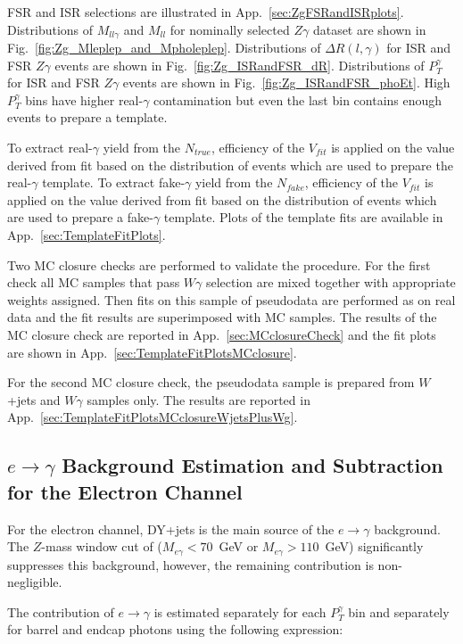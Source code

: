 FSR and ISR selections are illustrated in App.~\ref{sec:ZgFSRandISRplots}. Distributions of $M_{ll\gamma}$ and $M_{ll}$ for nominally selected $Z\gamma$ dataset are shown in Fig.~\ref{fig:Zg_Mleplep_and_Mpholeplep}. Distributions of $\Delta{R}(l,\gamma)$ for ISR and FSR $Z\gamma$ events are shown in Fig.~\ref{fig:Zg_ISRandFSR_dR}. Distributions of $P_{T}^{\gamma}$ for ISR and FSR $Z\gamma$ events are shown in Fig.~\ref{fig:Zg_ISRandFSR_phoEt}. High $P_{T}^{\gamma}$ bins have higher real-$\gamma$ contamination but even the last bin contains enough events to prepare a template. 

To extract real-$\gamma$ yield from the $N_{true}$, efficiency of the $V_{fit}$ is applied on the value derived from fit based on the distribution of events which are used to prepare the real-$\gamma$ template. To extract fake-$\gamma$ yield from the $N_{fake}$, efficiency of the $V_{fit}$ is applied on the value derived from fit based on the distribution of events which are used to prepare a fake-$\gamma$ template. Plots of the template fits are available in App.~\ref{sec:TemplateFitPlots}. 

Two MC closure checks are performed to validate the procedure. For the first check all MC samples that pass $W\gamma$ selection are mixed together with appropriate weights assigned. Then fits on this sample of pseudodata are performed as on real data and the fit results are superimposed with MC samples. The results of the MC closure check are reported in App.~\ref{sec:MCclosureCheck} and the fit plots are shown in App.~\ref{sec:TemplateFitPlotsMCclosure}. 

For the second MC closure check, the pseudodata sample is prepared from $W$+jets and $W\gamma$ samples only. The results are reported in App.~\ref{sec:TemplateFitPlotsMCclosureWjetsPlusWg}. 

\subsection{$e\rightarrow\gamma$ Background Estimation and Subtraction for the Electron Channel}
\label{sec:BackgroundSubtraction_etog}

For the electron channel, DY+jets is the main source of the $e \rightarrow \gamma$ background. The $Z$-mass window cut of ($M_{e\gamma}<70$~GeV or $M_{e\gamma}>110$~GeV) significantly suppresses this background, however, the remaining contribution is non-negligible. 

The contribution of $e\rightarrow\gamma$ is estimated separately for each $P_{T}^{\gamma}$ bin and separately for barrel and endcap photons using the following expression: 

